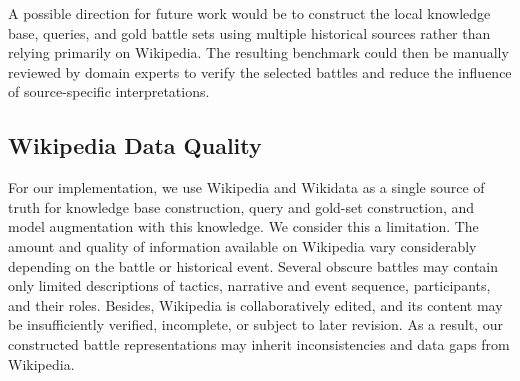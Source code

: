 A possible direction for future work would be to construct the local knowledge base, queries, and gold battle sets using multiple historical sources rather than relying primarily on Wikipedia. The resulting benchmark could then be manually reviewed by domain experts to verify the selected battles and reduce the influence of source-specific interpretations.
\subsection{Wikipedia Data Quality}
For our implementation, we use Wikipedia and Wikidata as a single source of truth for knowledge base construction, query and gold-set construction, and model augmentation with this knowledge. We consider this a limitation. The amount and quality of information available on Wikipedia vary considerably depending on the battle or historical event. Several obscure battles may contain only limited descriptions of tactics, narrative and event sequence, participants, and their roles. Besides, Wikipedia is collaboratively edited, and its content may be insufficiently verified, incomplete, or subject to later revision. As a result, our constructed battle representations may inherit inconsistencies and data gaps from Wikipedia.

